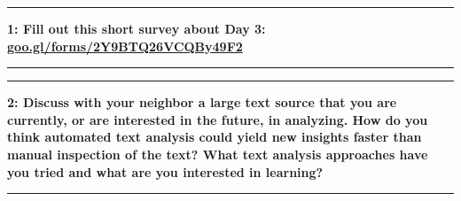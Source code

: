 \documentclass[11pt]{article}
\newcommand\question[2]{\vspace{.25in}\hrule\textbf{#1: #2}\vspace{.5em}\hrule\vspace{.10in}}
\begin{document}
\raggedright
\newcommand\NAME{Allie Morgan} 

\vspace{-0.2 in}
\question{1}{Fill out this short survey about Day 3: \href{https://goo.gl/forms/2Y9BTQ26VCQBy49F2}{goo.gl/forms/2Y9BTQ26VCQBy49F2}} 
\vspace{1 in}

\question{2}{Discuss with your neighbor a large text source that you are currently, or are interested in the future, in analyzing. How do you think automated text analysis could yield new insights faster than manual inspection of the text? What text analysis approaches have you tried and what are you interested in learning?} 
\end{document}

